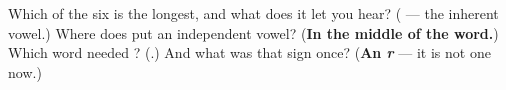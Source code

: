 \begin{tcolorbox}[breakable,colback=teal!4,colframe=teal!35!black,title={Before you move on}]
Which of the six is the longest, and what does it let you hear? (\textbf{} — the inherent vowel.) Where does \textbf{} put an independent vowel? (\textbf{In the middle of the word.}) Which word needed \textbf{}? (\textbf{}.) And what was that sign once? (\textbf{An \emph{r}} — it is not one now.)
\end{tcolorbox}
